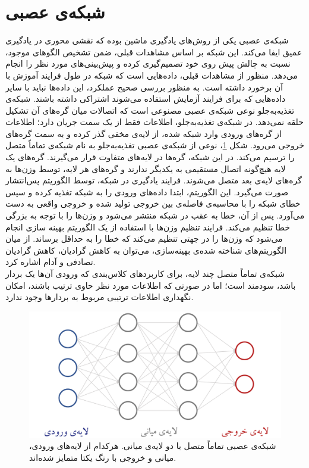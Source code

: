 \section{شبکه‌ی عصبی}
شبکه‌ی عصبی یکی از روش‌های یادگیری ماشین بوده که نقشی محوری در یادگیری عمیق ایفا می‌کند. این شبکه بر اساس مشاهدات قبلی، ضمن تشخیص الگوهای موجود، نسبت به چالش پیش روی خود تصمیم‌گیری کرده و پیش‌بینی‌های مورد نظر را انجام می‌دهد. منظور از مشاهدات قبلی، داده‌هایی است که شبکه در طول فرایند آموزش با آن برخورد داشته است. به منظور بررسی صحیح عملکرد، این داده‌ها نباید با سایر داده‌هایی که برای فرایند آزمایش استفاده می‌شوند اشتراکی داشته باشند.
شبکه‌ی تغذیه‌به‌جلو نوعی شبکه‌ی عصبی مصنوعی است که اتصالات میان گره‌های آن تشکیل حلقه نمی‌دهد. در شبکه‌ی تغذیه‌به‌جلو، اطلاعات فقط از یک سمت جریان دارد؛ اطلاعات از گره‌های ورودی وارد شبکه شده، از لایه‌ی مخفی گذر کرده و به سمت گره‌های خروجی می‌رود. شکل \ref{Fig:MLP}، نوعی از شبکه‌ی عصبی تغذیه‌به‌جلو به نام شبکه‌ی تماماً متصل را ترسیم می‌کند. در این شبکه، گره‌ها در لایه‌های متفاوت قرار می‌گیرند. گره‌های یک لایه هیچ‌گونه اتصال مستقیمی به یکدیگر ندارند و گره‌های هر لایه، توسط وزن‌ها به گره‌های لایه‌ی بعد متصل می‌شوند. فرایند یادگیری در شبکه، توسط الگوریتم پس‌انتشار صورت می‌گیرد. این الگوریتم، ابتدا داده‌های ورودی را به شبکه تغذیه کرده و سپس خطای شبکه را با محاسبه‌ی فاصله‌ی بین خروجی تولید شده و خروجی واقعی به دست می‌آورد. پس از آن،  خطا به عقب در شبکه منتشر می‌شود و وزن‌ها را با توجه به بزرگی خطا تنظیم می‌کند. فرایند تنظیم وزن‌ها با استفاده از یک الگوریتم بهینه سازی انجام می‌شود که وزن‌ها را در جهتی تنظیم می‌کند که خطا را به حداقل برساند. از میان الگوریتم‌های شناخته شده‌ی بهینه‌سازی، می‌توان به کاهش گرادیان، کاهش گرادیان تصادفی و آدام اشاره کرد.
\\
شبکه‌ی تماماً متصل چند لایه، برای کاربردهای کلاس‌بندی که ورودی آن‌ها یک بردار باشد، سودمند است؛ اما در صورتی که اطلاعات مورد نظر حاوی ترتیب باشند، امکان نگهداری اطلاعات ترتیبی مربوط به بردارها وجود ندارد.
 \begin{figure}[!htb]
 	\centering
 	\includegraphics[scale=0.4]{Figures/neuralnet.pdf}
 	\caption[شبکه‌ی عصبی تماماً متصل با دو لایه‌ی میانی]{شبکه‌ی عصبی تماماً متصل با دو لایه‌ی میانی. هرکدام از لایه‌های ورودی، میانی و خروجی با رنگ یکتا  متمایز شده‌اند.}
 	\label{Fig:MLP}
 \end{figure}




